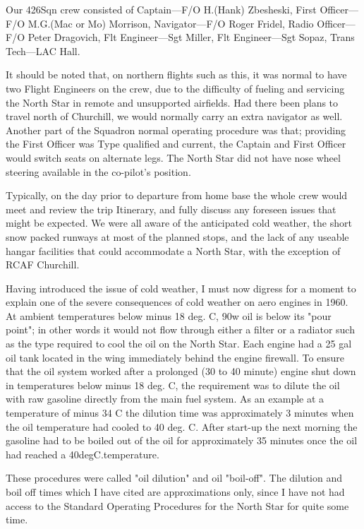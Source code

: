Our 426Sqn crew consisted of Captain---F/O H.(Hank) Zbesheski, First
Officer---F/O M.G.(Mac or Mo) Morrison, Navigator---F/O Roger Fridel,
Radio Officer---F/O Peter Dragovich, Flt Engineer---Sgt Miller, Flt
Engineer---Sgt Sopaz, Trans Tech---LAC Hall.

It should be noted that, on northern flights such as this, it was
normal to have two Flight Engineers on the crew, due to the difficulty
of fueling and servicing the North Star in remote and unsupported
airfields. Had there been plans to travel north of Churchill, we would
normally carry an extra navigator as well. Another part of the Squadron
normal operating procedure was that; providing the First Officer was
Type qualified and current, the Captain and First Officer would switch
seats on alternate legs. The North Star did not have nose wheel
steering available in the co-pilot's position.

Typically, on the day prior to departure from home base the whole crew
would meet and review the trip Itinerary, and fully discuss any
foreseen issues that might be expected. We were all aware of the
anticipated cold weather, the short snow packed runways at most of the
planned stops, and the lack of any useable hangar facilities that could
accommodate a North Star, with the exception of RCAF Churchill.

Having introduced the issue of cold weather, I must now digress for a
moment to explain one of the severe consequences of cold weather on
aero engines in 1960.   At ambient temperatures below minus 18 deg. C,
90w oil is below its "pour point"; in other words it would not flow
through either a filter or a radiator such as the type required to cool
the oil on the North Star. Each engine had a 25 gal oil tank located in
the wing immediately behind the engine firewall. To ensure that the oil
system worked after a prolonged (30 to 40 minute) engine shut down in
temperatures below minus 18 deg. C, the requirement was to dilute the
oil with raw gasoline directly from the main fuel system. As an example
at a temperature of minus 34 C the dilution time was approximately 3
minutes when the oil temperature had cooled to 40 deg. C. After
start-up the next morning the gasoline had to be boiled out of the oil
for approximately 35 minutes once the oil had reached a
40degC.temperature.

These procedures were called "oil dilution" and oil "boil-off". The
dilution and boil off times which I have cited are approximations only,
since I have not had access to the Standard Operating Procedures for
the North Star for quite some time.

